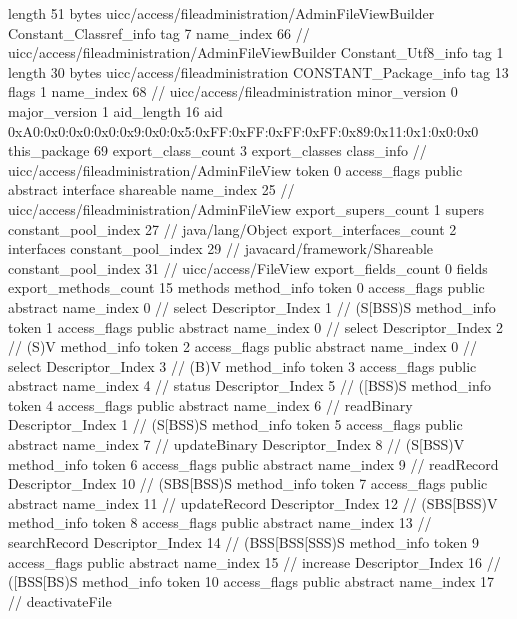{{{			length	51
			bytes	uicc/access/fileadministration/AdminFileViewBuilder
		}
		Constant_Classref_info {
			tag	7
			name_index	66		// uicc/access/fileadministration/AdminFileViewBuilder
		}
		Constant_Utf8_info {
			tag	1
			length	30
			bytes	uicc/access/fileadministration
		}
		CONSTANT_Package_info {
			tag	13
			flags	1
			name_index	68		// uicc/access/fileadministration
			minor_version	0
			major_version	1
			aid_length	16
			aid	0xA0:0x0:0x0:0x0:0x9:0x0:0x5:0xFF:0xFF:0xFF:0xFF:0x89:0x11:0x1:0x0:0x0
		}
	}
	this_package	69
	export_class_count	3
	export_classes {
		class_info {		// uicc/access/fileadministration/AdminFileView
			token	0
			access_flags	public abstract interface shareable
			name_index	25		// uicc/access/fileadministration/AdminFileView
			export_supers_count	1
			supers {
				constant_pool_index	27		// java/lang/Object
			}
			export_interfaces_count	2
			interfaces {
				constant_pool_index	29		// javacard/framework/Shareable
				constant_pool_index	31		// uicc/access/FileView
			}
			export_fields_count	0
			fields {
			}
			export_methods_count	15
			methods {
				method_info {
					token	0
					access_flags	public abstract
					name_index	0		// select
					Descriptor_Index	1		// (S[BSS)S
				}
				method_info {
					token	1
					access_flags	public abstract
					name_index	0		// select
					Descriptor_Index	2		// (S)V
				}
				method_info {
					token	2
					access_flags	public abstract
					name_index	0		// select
					Descriptor_Index	3		// (B)V
				}
				method_info {
					token	3
					access_flags	public abstract
					name_index	4		// status
					Descriptor_Index	5		// ([BSS)S
				}
				method_info {
					token	4
					access_flags	public abstract
					name_index	6		// readBinary
					Descriptor_Index	1		// (S[BSS)S
				}
				method_info {
					token	5
					access_flags	public abstract
					name_index	7		// updateBinary
					Descriptor_Index	8		// (S[BSS)V
				}
				method_info {
					token	6
					access_flags	public abstract
					name_index	9		// readRecord
					Descriptor_Index	10		// (SBS[BSS)S
				}
				method_info {
					token	7
					access_flags	public abstract
					name_index	11		// updateRecord
					Descriptor_Index	12		// (SBS[BSS)V
				}
				method_info {
					token	8
					access_flags	public abstract
					name_index	13		// searchRecord
					Descriptor_Index	14		// (BSS[BSS[SSS)S
				}
				method_info {
					token	9
					access_flags	public abstract
					name_index	15		// increase
					Descriptor_Index	16		// ([BSS[BS)S
				}
				method_info {
					token	10
					access_flags	public abstract
					name_index	17		// deactivateFile
}}}}}
